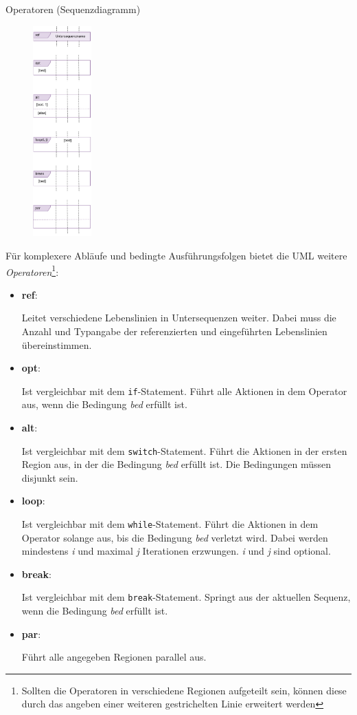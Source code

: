 \begin{defi}{Operatoren (Sequenzdiagramm)}
    \begin{figure}
        \centering
        \includegraphics[width=0.2\textwidth]{includes/figures/defi_diagrams_sequenz_operators.pdf}
    \end{figure}
    Für komplexere Abläufe und bedingte Ausführungsfolgen bietet die UML weitere \emph{Operatoren}\footnote{Sollten die Operatoren in verschiedene Regionen aufgeteilt sein, können diese durch das angeben einer weiteren gestrichelten Linie erweitert werden}:
    \begin{itemize}
        \item \textbf{ref}:

              Leitet verschiedene Lebenslinien in Untersequenzen weiter.
              Dabei muss die Anzahl und Typangabe der referenzierten und eingeführten Lebenslinien übereinstimmen.
        \item \textbf{opt}:

              Ist vergleichbar mit dem \texttt{if}-Statement.
              Führt alle Aktionen in dem Operator aus, wenn die Bedingung \emph{bed} erfüllt ist.
        \item \textbf{alt}:

              Ist vergleichbar mit dem \texttt{switch}-Statement.
              Führt die Aktionen in der ersten Region aus, in der die Bedingung \emph{bed} erfüllt ist.
              Die Bedingungen müssen disjunkt sein.
        \item \textbf{loop}:

              Ist vergleichbar mit dem \texttt{while}-Statement.
              Führt die Aktionen in dem Operator solange aus, bis die Bedingung \emph{bed} verletzt wird.
              Dabei werden mindestens \emph{i} und maximal \emph{j} Iterationen erzwungen.
              \emph{i} und \emph{j} sind optional.
        \item \textbf{break}:

              Ist vergleichbar mit dem \texttt{break}-Statement.
              Springt aus der aktuellen Sequenz, wenn die Bedingung \emph{bed} erfüllt ist.
        \item \textbf{par}:

              Führt alle angegeben Regionen parallel aus.
    \end{itemize}
\end{defi}